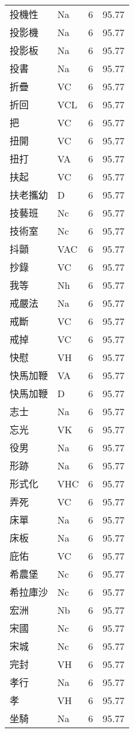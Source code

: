 \documentclass[twocolumn]{book}
\begin{document}
\begin{supertabular}{llrr}
投機性 & Na & 6 &  95.77\\
投影機 & Na & 6 &  95.77\\
投影板 & Na & 6 &  95.77\\
投書 & Na & 6 &  95.77\\
折疊 & VC & 6 &  95.77\\
折回 & VCL & 6 &  95.77\\
把 & VC & 6 &  95.77\\
扭開 & VC & 6 &  95.77\\
扭打 & VA & 6 &  95.77\\
扶起 & VC & 6 &  95.77\\
扶老攜幼 & D & 6 &  95.77\\
技藝班 & Nc & 6 &  95.77\\
技術室 & Nc & 6 &  95.77\\
抖顫 & VAC & 6 &  95.77\\
抄錄 & VC & 6 &  95.77\\
我等 & Nh & 6 &  95.77\\
戒嚴法 & Na & 6 &  95.77\\
戒斷 & VC & 6 &  95.77\\
戒掉 & VC & 6 &  95.77\\
快慰 & VH & 6 &  95.77\\
快馬加鞭 & VA & 6 &  95.77\\
快馬加鞭 & D & 6 &  95.77\\
志士 & Na & 6 &  95.77\\
忘光 & VK & 6 &  95.77\\
役男 & Na & 6 &  95.77\\
形跡 & Na & 6 &  95.77\\
形式化 & VHC & 6 &  95.77\\
弄死 & VC & 6 &  95.77\\
床單 & Na & 6 &  95.77\\
床板 & Na & 6 &  95.77\\
庇佑 & VC & 6 &  95.77\\
希農堡 & Nc & 6 &  95.77\\
希拉庫沙 & Nc & 6 &  95.77\\
宏洲 & Nb & 6 &  95.77\\
宋國 & Nc & 6 &  95.77\\
宋城 & Nc & 6 &  95.77\\
完封 & VH & 6 &  95.77\\
孝行 & Na & 6 &  95.77\\
孝 & VH & 6 &  95.77\\
坐騎 & Na & 6 &  95.77\\

\end{supertabular}
\end{document}
